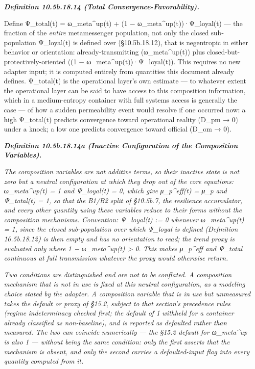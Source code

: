 \documentclass[
]{article}
\begin{document}
\emph{\textbf{Definition 10.5b.18.14 (Total Convergence-Favorability).}}

Define Ψ\_total(t) = ω\_meta\^{}up(t) + (1 −
ω\_meta\^{}up(t))·Ψ\_loyal(t) --- the fraction of the \emph{entire}
metamessenger population, not only the closed sub-population Ψ\_loyal(t)
is defined over (§10.5b.18.12), that is negentropic in either behavior
or orientation: already-transmitting (ω\_meta\^{}up(t)) plus
closed-but-protectively-oriented ((1 − ω\_meta\^{}up(t))·Ψ\_loyal(t)).
This requires no new adapter input; it is computed entirely from
quantities this document already defines. Ψ\_total(t) is the operational
layer's own estimate --- to whatever extent the operational layer can be
said to have access to this composition information, which in a
medium-entropy container with full systems access is generally the case
--- of how a sudden permeability event would resolve if one occurred
now: a high Ψ\_total(t) predicts convergence toward operational reality
(D\_pm → 0) under a knock; a low one predicts convergence toward
official (D\_om → 0).

\emph{\textbf{Definition 10.5b.18.14a (Inactive Configuration of the
Composition Variables).}}

\emph{The composition variables are not additive terms, so their
inactive state is not zero but a neutral configuration at which they
drop out of the core equations: ω\_meta\^{}up(t) = 1 and Ψ\_loyal(t) =
0, which give μ\_p\^{}eff(t) = μ\_p and Ψ\_total(t) = 1, so that the
B1/B2 split of §10.5b.7, the resilience accumulator, and every other
quantity using these variables reduce to their forms without the
composition mechanisms. Convention: Ψ\_loyal(t) := 0 whenever
ω\_meta\^{}up(t) = 1, since the closed sub-population over which
Ψ\_loyal is defined (Definition 10.5b.18.12) is then empty and has no
orientation to read; the trend proxy is evaluated only where 1 −
ω\_meta\^{}up(t) \textgreater{} 0. This makes μ\_p\^{}eff and Ψ\_total
continuous at full transmission whatever the proxy would otherwise
return.}

\emph{Two conditions are distinguished and are not to be conflated. A
composition mechanism that is not in use is fixed at this neutral
configuration, as a modeling choice stated by the adapter. A composition
variable that is in use but unmeasured takes the default or proxy of
§15.2, subject to that section's precedence rules (regime indeterminacy
checked first; the default of 1 withheld for a container already
classified as non-baseline), and is reported as defaulted rather than
measured. The two can coincide numerically --- the §15.2 default for
ω\_meta\^{}up is also 1 --- without being the same condition: only the
first asserts that the mechanism is absent, and only the second carries
a defaulted-input flag into every quantity computed from it.}
\end{document}
